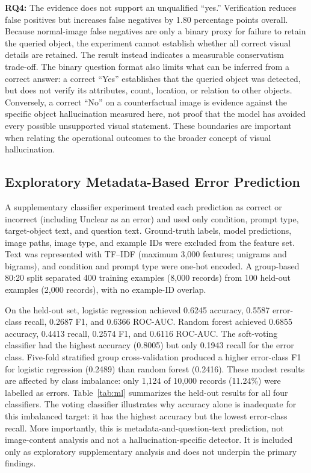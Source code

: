 \documentclass[conference]{IEEEtran}
\begin{document}
\textbf{RQ4:} The evidence does not support an unqualified ``yes.'' Verification reduces false positives but increases false negatives by 1.80 percentage points overall. Because normal-image false negatives are only a binary proxy for failure to retain the queried object, the experiment cannot establish whether all correct visual details are retained. The result instead indicates a measurable conservatism trade-off. The binary question format also limits what can be inferred from a correct answer: a correct ``Yes'' establishes that the queried object was detected, but does not verify its attributes, count, location, or relation to other objects. Conversely, a correct ``No'' on a counterfactual image is evidence against the specific object hallucination measured here, not proof that the model has avoided every possible unsupported visual statement. These boundaries are important when relating the operational outcomes to the broader concept of visual hallucination.

\subsection{Exploratory Metadata-Based Error Prediction}
A supplementary classifier experiment treated each prediction as correct or incorrect (including Unclear as an error) and used only condition, prompt type, target-object text, and question text. Ground-truth labels, model predictions, image paths, image type, and example IDs were excluded from the feature set. Text was represented with TF--IDF (maximum 3,000 features; unigrams and bigrams), and condition and prompt type were one-hot encoded. A group-based 80:20 split separated 400 training examples (8,000 records) from 100 held-out examples (2,000 records), with no example-ID overlap.

On the held-out set, logistic regression achieved 0.6245 accuracy, 0.5587 error-class recall, 0.2687 F1, and 0.6366 ROC-AUC. Random forest achieved 0.6855 accuracy, 0.4413 recall, 0.2574 F1, and 0.6116 ROC-AUC. The soft-voting classifier had the highest accuracy (0.8005) but only 0.1943 recall for the error class. Five-fold stratified group cross-validation produced a higher error-class F1 for logistic regression (0.2489) than random forest (0.2416). These modest results are affected by class imbalance: only 1,124 of 10,000 records (11.24\%) were labelled as errors. Table~\ref{tab:ml} summarizes the held-out results for all four classifiers. The voting classifier illustrates why accuracy alone is inadequate for this imbalanced target: it has the highest accuracy but the lowest error-class recall. More importantly, this is metadata-and-question-text prediction, not image-content analysis and not a hallucination-specific detector. It is included only as exploratory supplementary analysis and does not underpin the primary findings.
\end{document}
